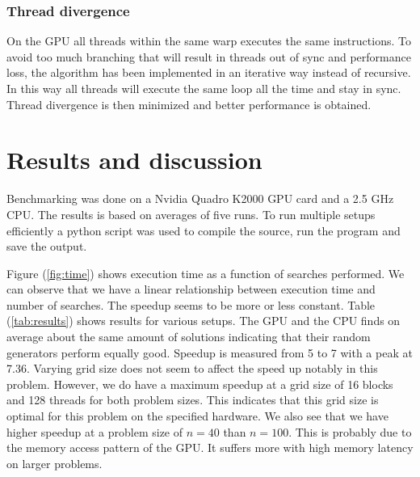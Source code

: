 \documentclass{article}
\begin{document}


\subsubsection{Thread divergence} %
\label{sub:threaddivergence}

On the GPU all threads within the same warp executes the same instructions. To avoid too much branching that will result
in threads out of sync and performance loss, the algorithm has been implemented in an iterative way instead of recursive. In this way all 
threads will execute the same loop all the time and stay in sync. Thread divergence is then minimized and better performance is 
obtained.


\section{Results and discussion}
Benchmarking was done on a Nvidia Quadro K2000 GPU card and a 2.5 GHz CPU. The results is based on
averages of five runs. To run multiple setups efficiently a python script was used to compile the source, run the program  and save
the output.

Figure (\ref{fig:time}) shows execution time as a function of searches performed. We can observe that we have a linear 
relationship between execution time and number of searches. The speedup seems to be more or less constant. Table (\ref{tab:results}) shows 
results for various setups. The GPU and the CPU finds on average about the same amount of solutions indicating that their
random generators perform equally good. Speedup is measured from 5 to 7 with a peak at 7.36. Varying grid size does not seem
to affect the speed up notably in this problem. However, we do have a maximum speedup at a grid size of 16 blocks and 128 threads for both
problem sizes. This indicates that this grid size is optimal for this problem on the specified hardware.  
We also see that we have higher speedup at a problem size of $n = 40$ than $n = 100$. This is probably due to the 
memory access pattern of the GPU. It suffers more with high memory latency on larger problems. 
\end{document}
